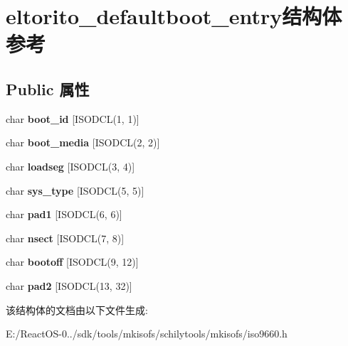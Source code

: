 \hypertarget{structeltorito__defaultboot__entry}{}\section{eltorito\+\_\+defaultboot\+\_\+entry结构体 参考}
\label{structeltorito__defaultboot__entry}
\subsection*{Public 属性}
\begin{DoxyCompactItemize}
\item 
\mbox{\label{structeltorito__defaultboot__entry_a4362d12e305a96c70fba631bb5099c02}} 
char {\bfseries boot\+\_\+id} \mbox{[}I\+S\+O\+D\+CL(1, 1)\mbox{]}
\item 
\mbox{\label{structeltorito__defaultboot__entry_a51f621c63b633d3a263903928220aa5f}} 
char {\bfseries boot\+\_\+media} \mbox{[}I\+S\+O\+D\+CL(2, 2)\mbox{]}
\item 
\mbox{\label{structeltorito__defaultboot__entry_ab0da0e6ca7c23c59c6276909bfd81919}} 
char {\bfseries loadseg} \mbox{[}I\+S\+O\+D\+CL(3, 4)\mbox{]}
\item 
\mbox{\label{structeltorito__defaultboot__entry_ad7092e06f5a50ed83061586ce1d999f1}} 
char {\bfseries sys\+\_\+type} \mbox{[}I\+S\+O\+D\+CL(5, 5)\mbox{]}
\item 
\mbox{\label{structeltorito__defaultboot__entry_a7895c7c849a3539c67d8ddbb938e3fad}} 
char {\bfseries pad1} \mbox{[}I\+S\+O\+D\+CL(6, 6)\mbox{]}
\item 
\mbox{\label{structeltorito__defaultboot__entry_a1142aa6b11e585e6bb06909145ff884f}} 
char {\bfseries nsect} \mbox{[}I\+S\+O\+D\+CL(7, 8)\mbox{]}
\item 
\mbox{\label{structeltorito__defaultboot__entry_ac44b8212fb914e88c3bc20e515030f97}} 
char {\bfseries bootoff} \mbox{[}I\+S\+O\+D\+CL(9, 12)\mbox{]}
\item 
\mbox{\label{structeltorito__defaultboot__entry_af211e3b136cd66c5e0e26b3d96c5d946}} 
char {\bfseries pad2} \mbox{[}I\+S\+O\+D\+CL(13, 32)\mbox{]}
\end{DoxyCompactItemize}


该结构体的文档由以下文件生成\+:\begin{DoxyCompactItemize}
\item 
E\+:/\+React\+O\+S-\/0../sdk/tools/mkisofs/schilytools/mkisofs/iso9660.\+h\end{DoxyCompactItemize}

